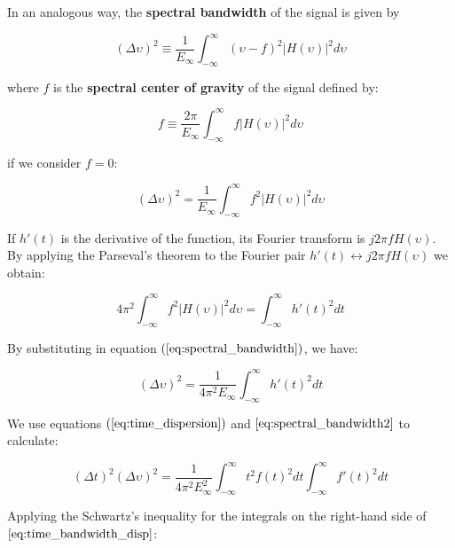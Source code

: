 In an analogous way, the \textbf{spectral bandwidth} of the signal is given by

\begin{equation}\label{eq:spectral_bandwidth_no_centered}
    (\Delta \upsilon)^2 \equiv \frac{1}{E_{\infty}} \int_{-\infty}^{\infty} (\upsilon-f)^2 |H(\upsilon)|^2 d\upsilon
\end{equation}

where $f$ is the \textbf{spectral center of gravity} of the signal defined by:

\begin{equation}\label{eq:spectral_center_of_gravity}
    f \equiv  \frac{2 \pi}{E_{\infty}} \int_{-\infty}^{\infty} f |H(\upsilon)|^2 d\upsilon
\end{equation}

if we consider $f=0$:

\begin{equation}\label{eq:spectral_bandwidth}
    (\Delta \upsilon)^2 = \frac{1}{E_{\infty}} \int_{-\infty}^{\infty} f^2 |H(\upsilon)|^2 d\upsilon 
\end{equation}

If $h'(t)$ is the derivative of the function, its Fourier transform is $j2\pi f H(\upsilon)$. By applying the Parseval's theorem to the Fourier pair $h'(t)\longleftrightarrow j2\pi f H(\upsilon)$ we obtain:

\begin{equation}\label{eq:applyed_parseval_theorem}
    4 \pi^{2} \int_{-\infty}^{\infty} f^2 |H(\upsilon)|^2 d\upsilon =  \int_{-\infty}^{\infty} h'(t)^2 dt
\end{equation}

By substituting in equation $(\eqref{eq:spectral_bandwidth})$, we have:

\begin{equation}\label{eq:spectral_bandwidth2}
    (\Delta \upsilon)^2 = \frac{1}{4 \pi^{2} E_{\infty}} \int_{-\infty}^{\infty} h'(t)^2 dt
\end{equation}

We use equations $(\eqref{eq:time_dispersion})$ and $\eqref{eq:spectral_bandwidth2}$ to calculate:

\begin{equation}\label{eq:time_bandwidth_disp}
    (\Delta t)^2(\Delta \upsilon)^2 = \frac{1}{4 \pi^{2} E_{\infty}^{2}} \int_{-\infty}^{\infty} t^2f(t)^2 dt \int_{-\infty}^{\infty}f'(t)^2 dt
\end{equation}

Applying the Schwartz's inequality for the integrals on the right-hand side of $\eqref{eq:time_bandwidth_disp}$:

